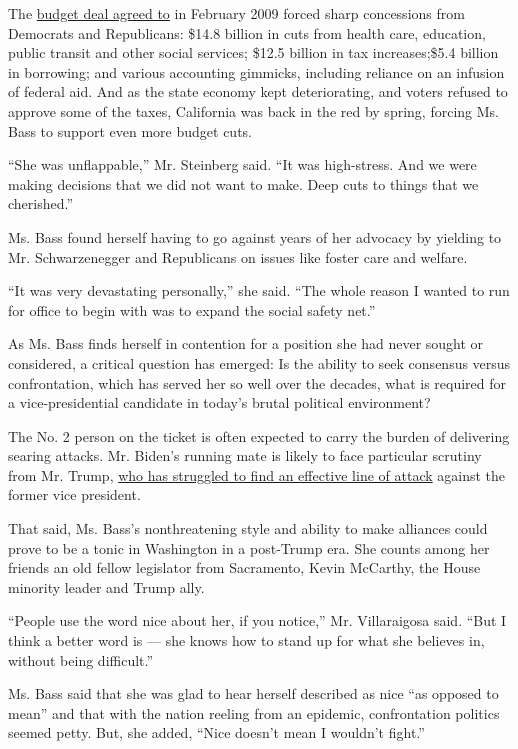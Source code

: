 The
\href{https://www.nytimes3xbfgragh.onion/2009/02/20/us/20california.html}{budget
deal agreed to} in February 2009 forced sharp concessions from Democrats
and Republicans: \$14.8 billion in cuts from health care, education,
public transit and other social services; \$12.5 billion in tax
increases;\$5.4 billion in borrowing; and various accounting gimmicks,
including reliance on an infusion of federal aid. And as the state
economy kept deteriorating, and voters refused to approve some of the
taxes, California was back in the red by spring, forcing Ms. Bass to
support even more budget cuts.

``She was unflappable,'' Mr. Steinberg said. ``It was high-stress. And
we were making decisions that we did not want to make. Deep cuts to
things that we cherished.''

Ms. Bass found herself having to go against years of her advocacy by
yielding to Mr. Schwarzenegger and Republicans on issues like foster
care and welfare.

``It was very devastating personally,'' she said. ``The whole reason I
wanted to run for office to begin with was to expand the social safety
net.''

As Ms. Bass finds herself in contention for a position she had never
sought or considered, a critical question has emerged: Is the ability to
seek consensus versus confrontation, which has served her so well over
the decades, what is required for a vice-presidential candidate in
today's brutal political environment?

The No. 2 person on the ticket is often expected to carry the burden of
delivering searing attacks. Mr. Biden's running mate is likely to face
particular scrutiny from Mr. Trump,
\href{https://www.nytimes3xbfgragh.onion/2020/07/10/us/biden-trump.html}{who
has struggled to find an effective line of attack} against the former
vice president.

That said, Ms. Bass's nonthreatening style and ability to make alliances
could prove to be a tonic in Washington in a post-Trump era. She counts
among her friends an old fellow legislator from Sacramento, Kevin
McCarthy, the House minority leader and Trump ally.

``People use the word nice about her, if you notice,'' Mr. Villaraigosa
said. ``But I think a better word is --- she knows how to stand up for
what she believes in, without being difficult.''

Ms. Bass said that she was glad to hear herself described as nice ``as
opposed to mean'' and that with the nation reeling from an epidemic,
confrontation politics seemed petty. But, she added, ``Nice doesn't mean
I wouldn't fight.''

